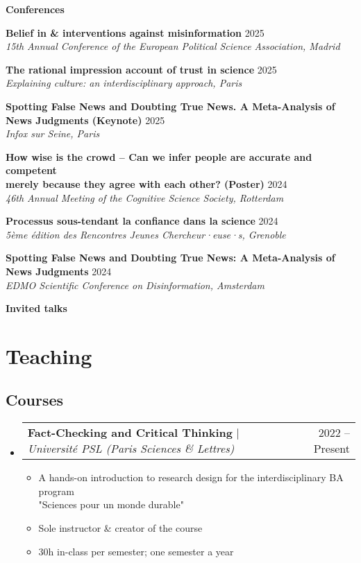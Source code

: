 \documentclass[letterpaper,11pt]{article}
\makeatletter
\newcommand{\resumeItem}[1]{
  \item\small{
    {#1 \vspace{-2pt}}
  }
}
\newcommand{\resumeItemWithYear}[3][ ]{ %
  \item\small{
    #2 \hfill {\small #3} \\
    #1
  }
}
\newcommand{\resumePublicationHeading}[1]{
  \vspace{5pt} %
  \noindent\textbf{\small #1} %
  \vspace{2pt} %
}
\newcommand{\resumeProjectHeading}[2]{
    \item
    \begin{tabular*}{0.97\textwidth}{l@{\extracolsep{\fill}}r}
      \small#1 & #2 \\
    \end{tabular*}\vspace{-7pt}
}
\newcommand{\resumeSubHeadingListStart}{\begin{itemize}[leftmargin=0.15in, label={}]}
\newcommand{\resumeSubHeadingListEnd}{\end{itemize}}
\newcommand{\resumeItemListStart}{\begin{itemize}}
\newcommand{\resumeItemListEnd}{\end{itemize}\vspace{-5pt}}
\makeatother
\begin{document}
\resumePublicationHeading{Conferences}
\begin{enumerate}[label={[{\arabic*.}]}, left=0.15in]
    \resumeItemWithYear{\textbf{Belief in \& interventions against misinformation}}{2025}{\textit{15th Annual Conference of the European Political Science Association, Madrid}} 
    \resumeItemWithYear{\textbf{The rational impression account of trust in science}}{2025}{\textit{Explaining culture: an interdisciplinary approach, Paris}} 
    \resumeItemWithYear{\textbf{Spotting False News and Doubting True News. A Meta-Analysis of News Judgments  (Keynote)}}{2025}{\textit{Infox sur Seine, Paris}}    
    \resumeItemWithYear{\textbf{How wise is the crowd -- Can we infer people are accurate and competent \\ merely because they agree with each other? (Poster)}}{2024}{\textit{46th Annual Meeting of the Cognitive Science Society, Rotterdam}}
    \resumeItemWithYear{\textbf{Processus sous-tendant la confiance dans la science}}{2024}{\textit{5ème édition des Rencontres Jeunes Chercheur·euse·s, Grenoble}}
    \resumeItemWithYear{\textbf{Spotting False News and Doubting True News: A Meta-Analysis of News Judgments}}{2024}{\textit{EDMO Scientific Conference on Disinformation, Amsterdam}}
\end{enumerate}



\resumePublicationHeading{Invited talks}
\begin{enumerate}[label={[{\arabic*.}]}, left=0.15in, resume]
    \resumeItemWithYear{\textbf{Trust in science}}{2025}{\textit{Paris School of International Affairs, Paris}
\end{enumerate}

\section{Teaching}

\subsection*{Courses}
    \resumeSubHeadingListStart
      \resumeProjectHeading
          {\textbf{Fact-Checking and Critical Thinking} $|$ \emph{Université PSL (Paris Sciences \& Lettres)}}{2022 -- Present}
          \resumeItemListStart
            \resumeItem{A hands-on introduction to research design for the interdisciplinary BA program \\ "Sciences pour un monde durable"}
            \resumeItem{Sole instructor \& creator of the course}
            \resumeItem{30h in-class per semester; one semester a year}
          \resumeItemListEnd
    \resumeSubHeadingListEnd
\end{document}
